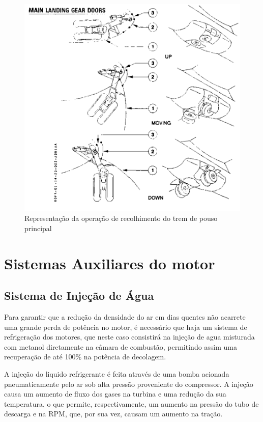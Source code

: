 \begin{figure}
\includegraphics[width=\textwidth]{images/parte3/sistemas_trem_de_pouso.png}
\caption{Representação da operação de recolhimento do trem de pouso principal}
\label{fig:sistemas_trem_de_pouso}
\end{figure}


\section{Sistemas Auxiliares do motor}

\subsection{Sistema de Injeção de Água}

Para garantir que a redução da densidade do ar em dias quentes não acarrete uma grande perda de potência no motor, é necessário que haja um sistema de refrigeração dos motores, que neste caso consistirá na injeção de agua misturada com metanol diretamente na câmara de combustão, permitindo assim uma recuperação de até 100\% na potência de decolagem.

A injeção do liquido refrigerante é feita através de uma bomba acionada pneumaticamente pelo ar sob alta pressão proveniente do compressor.
A injeção causa um aumento de fluxo dos gases na turbina e uma redução da sua temperatura, o que permite, respectivamente, um aumento na pressão do tubo de descarga e na RPM, que, por sua vez, causam um aumento na tração.

